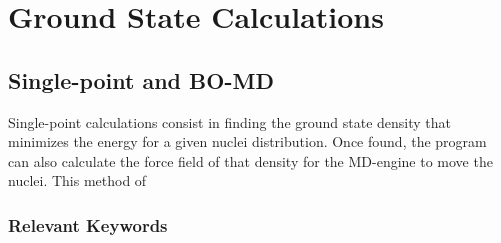 \chapter{Ground State Calculations}


\section{Single-point and BO-MD}

Single-point calculations consist in finding the ground state density that minimizes the energy
for a given nuclei distribution. Once found, the program can also calculate the force field of
that density for the MD-engine to move the nuclei. This method of 

    \subsection{Relevant Keywords}

